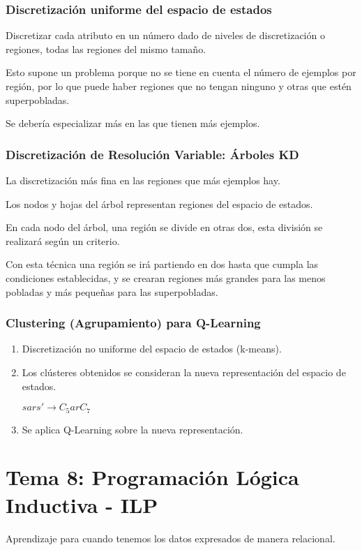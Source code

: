 \documentclass[12pt, twoside, openright]{report} %
\begin{document}
\subsection{Discretización uniforme del espacio de estados}
Discretizar cada atributo en un número dado de niveles de discretización o regiones, todas las regiones del mismo tamaño.

Esto supone un problema porque no se tiene en cuenta el número de ejemplos por región, por lo que puede haber regiones que no tengan ninguno y otras que estén superpobladas.

Se debería especializar más en las que tienen más ejemplos.

\subsection{Discretización de Resolución Variable: Árboles KD}
La discretización más fina en las regiones que más ejemplos hay.

Los nodos y hojas del árbol representan regiones del espacio de estados.

En cada nodo del árbol, una región se divide en otras dos, esta división se realizará según un criterio.

Con esta técnica una región se irá partiendo en dos hasta que cumpla las condiciones establecidas, y se crearan regiones más grandes para las menos pobladas y más pequeñas para las superpobladas.

\subsection{Clustering (Agrupamiento) para Q-Learning}
\begin{enumerate}
	\item Discretización no uniforme del espacio de estados (k-means).
	\item Los clústeres obtenidos se consideran la nueva representación del espacio de estados.

	      $sars' \rightarrow C_5arC_7$
	\item Se aplica Q-Learning sobre la nueva representación.
\end{enumerate}

\chapter{Tema 8: Programación Lógica Inductiva - ILP}
Aprendizaje para cuando tenemos los datos expresados de manera relacional.
\end{document}
